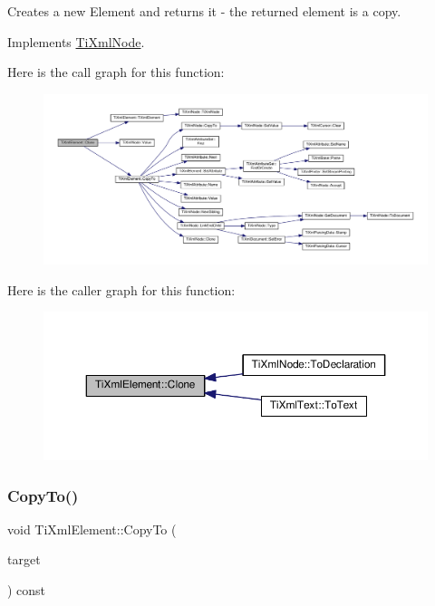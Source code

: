 Creates a new Element and returns it -\/ the returned element is a copy. 



Implements \hyperlink{class_ti_xml_node_a4508cc3a2d7a98e96a54cc09c37a78a4}{Ti\+Xml\+Node}.

Here is the call graph for this function\+:
\nopagebreak
\begin{figure}[H]
\begin{center}
\leavevmode
\includegraphics[width=350pt]{class_ti_xml_element_a810ea8fa40844c01334e5af2a26794cb_cgraph}
\end{center}
\end{figure}
Here is the caller graph for this function\+:
\nopagebreak
\begin{figure}[H]
\begin{center}
\leavevmode
\includegraphics[width=350pt]{class_ti_xml_element_a810ea8fa40844c01334e5af2a26794cb_icgraph}
\end{center}
\end{figure}
\mbox{\label{class_ti_xml_element_ab931f2208ed76ba03465d8a1f86b5935}} 
\subsubsection{\texorpdfstring{Copy\+To()}{CopyTo()}}
{\footnotesize\ttfamily void Ti\+Xml\+Element\+::\+Copy\+To (\begin{DoxyParamCaption}\item[{\hyperlink{class_ti_xml_element}{Ti\+Xml\+Element} $\ast$}]{target }\end{DoxyParamCaption}) const\hspace{0.3cm}{\ttfamily [protected]}}

